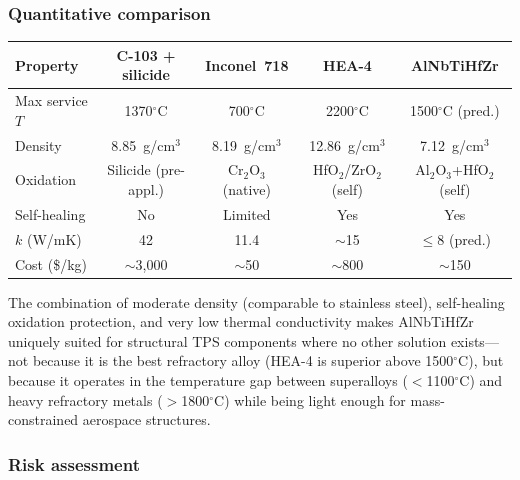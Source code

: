 \documentclass[12pt,letterpaper]{article}
\theoremstyle{definition}
\begin{document}
\subsubsection{Quantitative comparison}

\begin{center}
\small
\begin{tabular}{@{}lcccc@{}}
\toprule
Property & C-103 + silicide & Inconel~718 & HEA-4 & AlNbTiHfZr \\
\midrule
Max service $T$ & 1370$^\circ$C & 700$^\circ$C & 2200$^\circ$C & 1500$^\circ$C (pred.) \\
Density & 8.85~g/cm$^3$ & 8.19~g/cm$^3$ & 12.86~g/cm$^3$ & 7.12~g/cm$^3$ \\
Oxidation & Silicide (pre-appl.) & Cr$_2$O$_3$ (native) & HfO$_2$/ZrO$_2$ (self) & Al$_2$O$_3$+HfO$_2$ (self) \\
Self-healing & No & Limited & Yes & Yes \\
$k$ (W/mK) & 42 & 11.4 & $\sim$15 & $\leq$8 (pred.) \\
Cost (\$/kg) & $\sim$3,000 & $\sim$50 & $\sim$800 & $\sim$150 \\
\bottomrule
\end{tabular}
\normalsize
\end{center}

The combination of moderate density (comparable to stainless steel), self-healing oxidation protection, and very low thermal conductivity makes AlNbTiHfZr uniquely suited for structural TPS components where no other solution exists---not because it is the best refractory alloy (HEA-4 is superior above 1500$^\circ$C), but because it operates in the temperature gap between superalloys ($<$1100$^\circ$C) and heavy refractory metals ($>$1800$^\circ$C) while being light enough for mass-constrained aerospace structures.

\subsubsection{Risk assessment}
\end{document}
